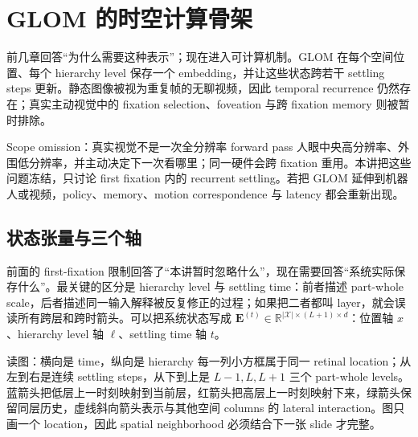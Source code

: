 \section{GLOM 的时空计算骨架}

前几章回答“为什么需要这种表示”；现在进入可计算机制。GLOM 在每个空间位置、每个 hierarchy level 保存一个 embedding，并让这些状态跨若干 settling steps 更新。静态图像被视为重复帧的无聊视频，因此 temporal recurrence 仍然存在；真实主动视觉中的 fixation selection、foveation 与跨 fixation memory 则被暂时排除。


\begin{warningbox}{Scope omission：真实视觉不是一次全分辨率 forward pass}
人眼中央高分辨率、外围低分辨率，并主动决定下一次看哪里；同一硬件会跨 fixation 重用。本讲把这些问题冻结，只讨论 first fixation 内的 recurrent settling。若把 GLOM 延伸到机器人或视频，policy、memory、motion correspondence 与 latency 都会重新出现。
\end{warningbox}

\subsection{状态张量与三个轴}

前面的 first-fixation 限制回答了“本讲暂时忽略什么”，现在需要回答“系统实际保存什么”。最关键的区分是 hierarchy level 与 settling time：前者描述 part-whole scale，后者描述同一输入解释被反复修正的过程；如果把二者都叫 layer，就会误读所有跨层和跨时箭头。可以把系统状态写成 $\mathbf E^{(t)}\in\mathbb R^{|\mathcal X|\times(L+1)\times d}$：位置轴 $x$、hierarchy level 轴 $\ell$、settling time 轴 $t$。


\begin{knowledgebox}{读图：横向是 time，纵向是 hierarchy}
每一列小方框属于同一 retinal location；从左到右是连续 settling steps，从下到上是 $L-1,L,L+1$ 三个 part-whole levels。蓝箭头把低层上一时刻映射到当前层，红箭头把高层上一时刻映射下来，绿箭头保留同层历史，虚线斜向箭头表示与其他空间 columns 的 lateral interaction。图只画一个 location，因此 spatial neighborhood 必须结合下一张 slide 才完整。
\end{knowledgebox}

